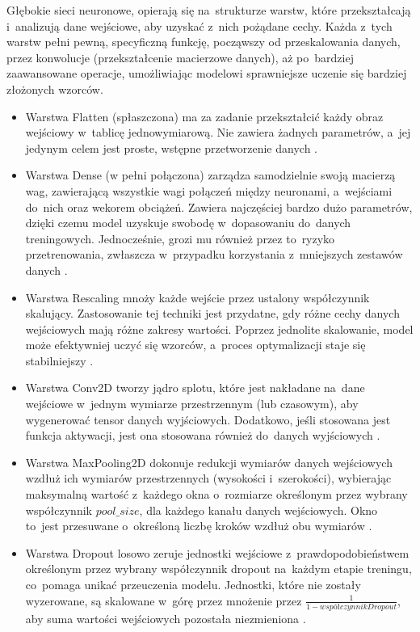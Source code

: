 Głębokie sieci neuronowe, opierają się na~strukturze warstw,
które przekształcają i~analizują dane wejściowe, aby uzyskać z~nich pożądane cechy.
Każda z~tych warstw pełni pewną, specyficzną funkcję, począwszy od przeskalowania danych,
przez konwolucje (przekształcenie macierzowe danych),
aż po~bardziej zaawansowane operacje, umożliwiając modelowi sprawniejsze uczenie się bardziej złożonych wzorców.
\begin{itemize}[label=-,labelsep=0.4cm,leftmargin=0.6cm]   
	\item Warstwa Flatten (spłaszczona) ma za zadanie przekształcić każdy obraz wejściowy w~tablicę jednowymiarową.
		Nie zawiera żadnych parametrów, a~jej jedynym celem jest proste, wstępne przetworzenie danych \cite{Geron2020}.
	\item Warstwa Dense (w pełni połączona) zarządza samodzielnie swoją macierzą wag,
		zawierającą wszystkie wagi połączeń między neuronami, a~wejściami do~nich oraz wekorem obciążeń.
		Zawiera najczęściej bardzo dużo parametrów, dzięki czemu model uzyskuje swobodę w~dopasowaniu do~danych treningowych.
		Jednocześnie, grozi mu również przez to~ryzyko przetrenowania,
		zwłaszcza w~przypadku korzystania z~mniejszych zestawów danych \cite{Geron2020}.
    \item Warstwa Rescaling mnoży każde wejście przez ustalony współczynnik skalujący.
		Zastosowanie tej techniki jest przydatne, gdy różne cechy danych wejściowych mają różne zakresy wartości.
		Poprzez jednolite skalowanie, model może efektywniej uczyć się wzorców, a~proces optymalizacji staje się stabilniejszy \cite{Fenner2020}.
	\item Warstwa Conv2D tworzy jądro splotu, które jest nakładane na~dane wejściowe w~jednym wymiarze przestrzennym (lub czasowym), 
		aby wygenerować tensor danych wyjściowych.
		Dodatkowo, jeśli stosowana jest funkcja aktywacji, jest ona stosowana również do~danych wyjściowych \cite{Geron2020}.
	\item Warstwa MaxPooling2D dokonuje redukcji wymiarów danych wejściowych wzdłuż ich wymiarów przestrzennych (wysokości i~szerokości),
		wybierając maksymalną wartość z~każdego okna o~rozmiarze określonym przez wybrany współczynnik $pool\_size$,
		dla każdego kanału danych wejściowych.
		Okno to~jest przesuwane o~określoną liczbę kroków wzdłuż obu wymiarów \cite{Geron2020}.
	\item Warstwa Dropout losowo zeruje jednostki wejściowe z~prawdopodobieństwem określonym
		przez wybrany współczynnik dropout na~każdym etapie treningu, co~pomaga unikać przeuczenia modelu.
		Jednostki, które nie zostały wyzerowane, są skalowane w~górę przez mnożenie przez $\frac{1}{1 - współczynnikDropout}$,
		aby suma wartości wejściowych pozostała niezmieniona \cite{Geron2020}.
\end{itemize}